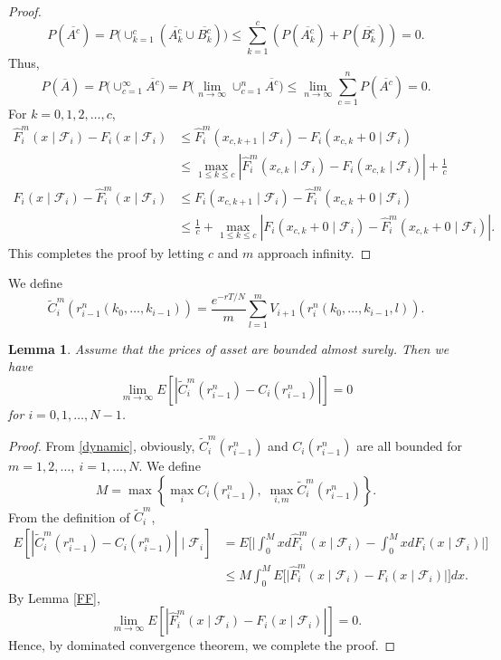 \documentclass[10pt,a4paper]{amsart}
\numberwithin{equation}{section}
\newtheorem{lemma}[theo]{Lemma}
\begin{document}
\begin{proof}
\[
P\left(\overline{A^c}\right) 
=P\Big(\cup_{k=1}^c\left(\overline{A_k^c} \cup \overline{B_k^c}\right)\Big) 
\leq \sum_{k=1}^c\left(P\left(\overline{A_k^c}\right)+P\left(\overline{B_k^c}\right)
\right)=0.
\]
Thus,
\[
P( \overline{A}) =P\Big(\cup_{c=1}^{\infty} \overline{A^c}\Big)
=P\Big(\lim _{n \to \infty} \cup_{c=1}^n \overline{A^c}\Big) 
\leq \lim _{n \to \infty} \sum_{c=1}^n P\left(\overline{A^c}\right)=0.
\]
For $k=0,1,2, \dots, c$,
\begin{align}
\hat{F}_i^m\left(x\mid \mathcal{F}_i \right)-F_i\left(x\mid \mathcal{F}_i \right) & \leq \hat{F}_i^m\left(x_{c, k+1}\mid \mathcal{F}_i \right)-F_i\left(x_{c, k}+0\mid \mathcal{F}_i\right) \\
& \leq \max_{ 1 \leq k \leq c }\left|\hat{F}_i^m\left(x_{c, k}\mid \mathcal{F}_i \right)-F_i\left(x_{c, k}\mid \mathcal{F}_i\right)\right|+\frac{1}{c}\\
F_i\left(x\mid \mathcal{F}_i \right)-\hat{F}_i^m\left(x\mid \mathcal{F}_i \right) & \leq F_i\left(x_{c, k+1}\mid \mathcal{F}_i\right)-\hat{F}_i^m\left(x_{c, k}+0\mid \mathcal{F}_i \right) \\
& \leq \frac{1}{c}+\max_{ 1 \leq k \leq c }\left|F_i\left(x_{c, k}
+0\mid \mathcal{F}_i\right)-\hat{F}_i^m\left(x_{c, k}+0\mid \mathcal{F}_i \right)\right|.
\end{align}
This completes the proof by letting $c$ and $m$ approach infinity.
\end{proof}

We define
\[
 \widetilde{C}_i^m\left(r_{i-1}^{n}\left(k_0,\dots,k_{i-1}\right)\right)
 =\frac{e^{-rT/N}}{m} \sum_{l=1}^{m} V_{i+1}\left(r_{i}^{n}
 \left(k_0,\dots,k_{i-1},l\right)\right).
\]

\begin{lemma}
\label{CC1}
Assume that the prices of asset are bounded almost surely. Then we have 
 \[
 \lim _{m \to \infty} E\left[\left|\widetilde{C}_i^m\left(r_{i-1}^n\right)-C_i\left(r_{i-1}^n\right)\right|\right] = 0
 \]
for $i=0,1, \dots, N-1$.
\end{lemma}

\begin{proof}
From \eqref{dynamic}, obviously, $\widetilde{C}_i^m\left(r_{i-1}^n\right)$ and 
$C_i\left(r_{i-1}^n\right)$ are all bounded for $m=1,2, \dots, \ i=1, \dots, N$.
We define
\[
 M=\max \left\{\max_i C_i\left(r_{i-1}^n\right), \; 
 \max _{i, m} \widetilde{C}_i^m\left(r_{i-1}^n\right)\right\} .
\]
From the definition of $\widetilde{C}_i^m$,
 \begin{align*}
E\left[\left|\widetilde{C}_i^m\left(r_{i-1}^n\right)-C_i\left(r_{i-1}^n\right)\right| \mid \mathcal{F}_i\right] & =E\Big[\Big|\int_0^M x d \hat{F}_i^m\left(x\mid \mathcal{F}_i \right)-\int_0^M x d F_i\left(x\mid \mathcal{F}_i \right)\Big|\Big] \\
& \leq M\int_0^M E\Big[\Big|\hat{F}_i^m\left(x\mid \mathcal{F}_i \right)
-F_i\left(x\mid \mathcal{F}_i \right)\Big|\Big] d x .
\end{align*}
By Lemma \ref{FF},
\[
 \lim _{m \to \infty} E\left[\left|\hat{F}_i^m\left(x\mid \mathcal{F}_i \right)-F_i\left(x\mid \mathcal{F}_i \right)\right|\right]=0.
\]
Hence, by dominated convergence theorem, we complete the proof.
\end{proof}
\end{document}
